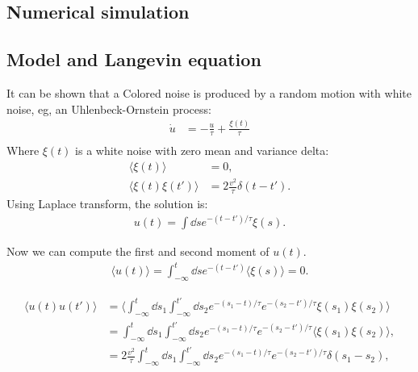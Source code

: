 \documentclass[%
10pt,
superscriptaddress,
twocolumn,
 amsmath,amssymb,
 aps,prx,
]{revtex4-2}
\begin{document}
\subsection{Numerical simulation}
\subsection*{Model and Langevin equation}
It can be shown that a Colored noise is produced by a random motion with white noise, eg, an Uhlenbeck-Ornstein process:
\begin{align}
  \dot{u}&=-\frac{u}{\tau}+\frac{\xi(t)}{\tau}\\
\end{align}
Where $\xi(t)$ is a white noise with zero mean and variance delta:
\begin{align}
  \langle \xi(t)\rangle &=0,\\
  \langle \xi(t)\xi(t')\rangle &=2\frac{v^2}{\tau}\delta(t-t').
\end{align}
Using Laplace transform, the solution is:
\begin{align}
  u(t)=\int \dd s e^{-(t-t')/\tau}\xi(s).
\end{align}

Now we can compute the first and second moment of $u(t)$. 
\begin{align}
  \langle u(t)\rangle = \int_{-\infty}^{t} \dd s e^{-(t-t')} \langle \xi(s)\rangle =0.
\end{align}

\begin{align}
  \langle u(t)u(t')\rangle &= \langle \int_{-\infty}^{t} \dd{s_1} \int_{-\infty}^{t'} \dd s_2 e^{-(s_1-t)/\tau} e^{-(s_2-t')/\tau} \xi(s_1)\xi(s_2)\rangle\\
  &= \int_{-\infty}^{t}  \dd{s_1} \int_{-\infty}^{t'} \dd s_2 e^{-(s_1-t)/\tau} e^{-(s_2-t')/\tau} \langle \xi(s_1)\xi(s_2) \rangle,\\
  &= 2\frac{v^2}{\tau}\int_{-\infty}^{t}  \dd{s_1} \int_{-\infty}^{t'} \dd s_2 e^{-(s_1-t)/\tau} e^{-(s_2-t')/\tau} \delta(s_1-s_2),\\
\end{align}





\end{document}
